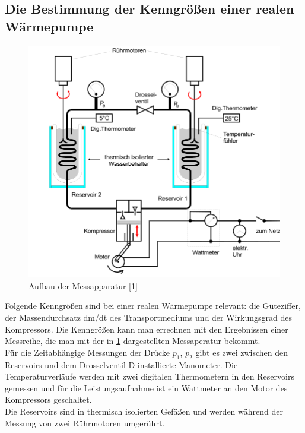 \subsection{Die Bestimmung der Kenngrößen einer realen Wärmepumpe}
\begin{figure}
    \centering
    \includegraphics[scale=0.5]{aufbau2.pdf}
    \caption{Aufbau der Messapparatur [1]}
    \label{fig:aufbau2}
\end{figure}
Folgende Kenngrößen sind bei einer realen Wärmepumpe relevant: die Güteziffer, der Massendurchsatz dm/dt des Transportmediums und der Wirkungsgrad des Kompressors. Die Kenngrößen kann man errechnen mit den 
Ergebnissen einer Messreihe, die man mit der in \ref{fig:aufbau2} dargestellten Messaperatur bekommt.\\
Für die Zeitabhängige Messungen der Drücke $p_1$, $p_2$ gibt es zwei zwischen den Reservoirs und dem Drosselventil D installierte Manometer. Die 
Temperaturverläufe werden mit zwei digitalen Thermometern in den Reservoirs gemessen und für die Leistungsaufnahme ist ein Wattmeter an den Motor des Kompressors geschaltet.\\
Die Reservoirs sind in thermisch isolierten Gefäßen und werden während der Messung von zwei Rührmotoren umgerührt.\\
